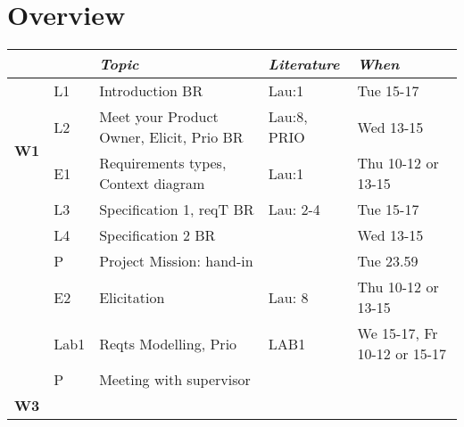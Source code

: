 \newpage

\section{Overview}

\begin{flushleft}
\small
\begin{tabular}{c | p{0.5cm} p{4.4cm} p{2.2cm}  p{3.2cm}}
 &  & {\it Topic} & {\it Literature} & {\it When}   \\
\hline
\multirow{4}{*}{{\bfseries\sffamily W1}} 
& L1 & Introduction BR & Lau:1 & Tue 15-17\\
& L2 & Meet your Product Owner, Elicit, Prio BR & Lau:8, PRIO  & Wed 13-15\\
& E1 & Requirements types, Context diagram &  Lau:1  & Thu 10-12 or 13-15\\
\hline
\multirow{4}{*}{{\bfseries\sffamily W2}} 
& L3 & Specification 1, reqT BR   & Lau: 2-4  & Tue 15-17\\
& L4 & Specification 2 BR &  & Wed 13-15 \\
& P  & Project Mission: hand-in&  & Tue 23.59 \\
& E2 & Elicitation  & Lau: 8  & Thu 10-12 or 13-15\\
& Lab1 & Reqts Modelling, Prio & LAB1 &   We 15-17, Fr 10-12 or 15-17\\
& P & Meeting with supervisor & & \\
\hline
\multirow{4}{*}{{\bfseries\sffamily W3}} 


\end{tabular}
\end{flushleft}
